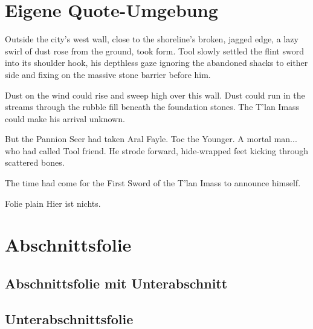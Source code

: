 \documentclass[aspectratio=1610]{beamer}
\begin{document}
\section{Eigene Quote-Umgebung}
\begin{frame}
	\begin{authquote}
		Outside the city's west wall, close to the shoreline's broken, jagged edge, a lazy swirl of dust rose from the ground, took form. Tool slowly settled the flint sword into its shoulder hook, his depthless gaze ignoring the abandoned shacks to either side and fixing on the massive stone barrier before him.
		
		Dust on the wind could rise and sweep high over this wall. Dust could run in the streams through the rubble fill beneath the foundation stones. The T'lan Imass could make his arrival unknown.
		
		But the Pannion Seer had taken Aral Fayle. Toc the Younger. A mortal man... who had called Tool friend. He strode forward, hide-wrapped feet kicking through scattered bones.
		
		The time had come for the First Sword of the T'lan Imass to announce himself.
	\end{authquote}
\end{frame}

\begin{frame}[plain]{Folie plain}
	Hier ist nichts.
\end{frame}

\section{Abschnittsfolie}

\begin{frame}
	\sectionpage
\end{frame}

\subsection{Abschnittsfolie mit Unterabschnitt}
\begin{frame}
	\sectionpage
\end{frame}

\subsection{Unterabschnittsfolie}
\begin{frame}
	\subsectionpage
\end{frame}
	
	
	
	
\end{document}
